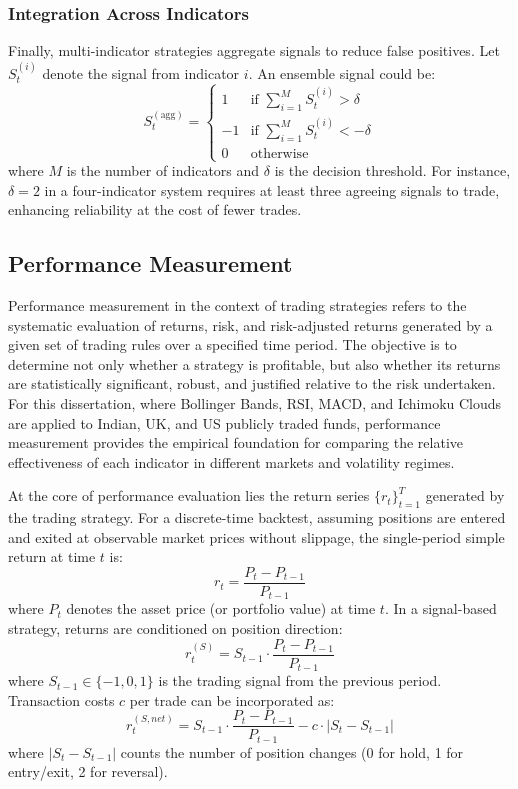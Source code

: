 \subsubsection{Integration Across Indicators}

Finally, multi-indicator strategies aggregate signals to reduce false positives. Let $S_t^{(i)}$ denote the signal from indicator $i$. An ensemble signal could be:
\[
S_t^{(\text{agg})} = 
\begin{cases}
1 & \text{if } \sum_{i=1}^M S_t^{(i)} > \delta \\
-1 & \text{if } \sum_{i=1}^M S_t^{(i)} < -\delta \\
0 & \text{otherwise}
\end{cases}
\]
where $M$ is the number of indicators and $\delta$ is the decision threshold. For instance, $\delta = 2$ in a four-indicator system requires at least three agreeing signals to trade, enhancing reliability at the cost of fewer trades.


\subsection{Performance Measurement}

Performance measurement in the context of trading strategies refers to the systematic evaluation of returns, risk, and risk-adjusted returns generated by a given set of trading rules over a specified time period. The objective is to determine not only whether a strategy is profitable, but also whether its returns are statistically significant, robust, and justified relative to the risk undertaken. For this dissertation, where Bollinger Bands, RSI, MACD, and Ichimoku Clouds are applied to Indian, UK, and US publicly traded funds, performance measurement provides the empirical foundation for comparing the relative effectiveness of each indicator in different markets and volatility regimes.

At the core of performance evaluation lies the return series $\{r_t\}_{t=1}^T$ generated by the trading strategy. For a discrete-time backtest, assuming positions are entered and exited at observable market prices without slippage, the single-period simple return at time $t$ is:
\[
r_t = \frac{P_t - P_{t-1}}{P_{t-1}}
\]
where $P_t$ denotes the asset price (or portfolio value) at time $t$. In a signal-based strategy, returns are conditioned on position direction:
\[
r_t^{(S)} = S_{t-1} \cdot \frac{P_t - P_{t-1}}{P_{t-1}}
\]
where $S_{t-1} \in \{-1, 0, 1\}$ is the trading signal from the previous period. Transaction costs $c$ per trade can be incorporated as:
\[
r_t^{(S,net)} = S_{t-1} \cdot \frac{P_t - P_{t-1}}{P_{t-1}} - c \cdot |S_t - S_{t-1}|
\]
where $|S_t - S_{t-1}|$ counts the number of position changes (0 for hold, 1 for entry/exit, 2 for reversal).

